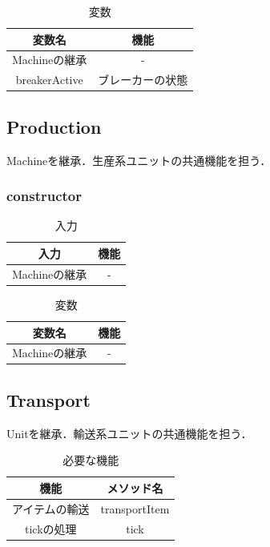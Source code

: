 \documentclass[uplatex,dvipdfmx,report]{jlreq}
\begin{document}
\begin{table}[H]
    \centering
    \caption{変数}
    \begin{tabular}{cc}
        \hline
        変数名 & 機能 \\
        \hline
        \hline
        Machineの継承 & - \\
        breakerActive & ブレーカーの状態 \\
        \hline
    \end{tabular}
\end{table}

\subsection{Production}

Machineを継承．生産系ユニットの共通機能を担う．

\subsubsection{constructor}

\begin{table}[H]
    \centering
    \caption{入力}
    \begin{tabular}{cc}
        \hline
        入力 & 機能 \\
        \hline
        \hline
        Machineの継承 & - \\
        \hline
    \end{tabular}
\end{table}

\begin{table}[H]
    \centering
    \caption{変数}
    \begin{tabular}{cc}
        \hline
        変数名 & 機能 \\
        \hline
        \hline
        Machineの継承 & - \\
        \hline
    \end{tabular}
\end{table}

\subsection{Transport}

Unitを継承．輸送系ユニットの共通機能を担う．

\begin{table}[H]
    \centering
    \caption{必要な機能}
    \begin{tabular}{cc}
        \hline
        機能 & メソッド名 \\
        \hline
        \hline
        アイテムの輸送 & transportItem \\
        tickの処理 & tick \\
        \hline
    \end{tabular}
\end{table}
\end{document}
